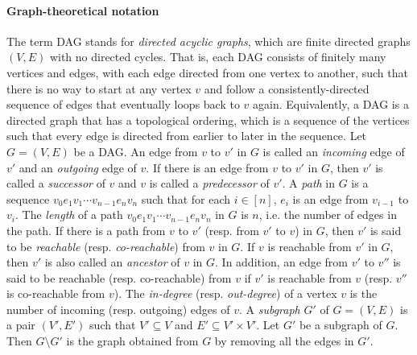 \paragraph{Graph-theoretical notation}
The term DAG stands for \emph{directed acyclic graphs}, which are finite directed graphs $(V, E)$ with no directed cycles. That is, each DAG consists of finitely many vertices and edges, with each edge directed from one vertex to another, such that there is no way to start at any vertex $\mathit{v}$ and follow a consistently-directed sequence of edges that eventually loops back to $\mathit{v}$ again. Equivalently, a DAG is a directed graph that has a topological ordering, which is a sequence of the vertices such that every edge is directed from earlier to later in the sequence. Let $G=(V,E)$ be a DAG. An edge from $\mathit{v}$ to $\mathit{v'}$ in $G$ is called an \emph{incoming} edge of $\mathit{v'}$ and an \emph{outgoing} edge of $\mathit{v}$. If there is an edge from $\mathit{v}$ to $\mathit{v'}$ in $G$, then $\mathit{v'}$ is called a \emph{successor} of $\mathit{v}$ and $\mathit{v}$ is called a \emph{predecessor} of $\mathit{v'}$. A \emph{path} in $G$ is a sequence $\mathit{v}_0 \mathit{e}_1 \mathit{v}_1 \cdots \mathit{v}_{n-1} \mathit{e}_n \mathit{v}_n$ such that for each $i \in [n]$, $e_i$ is an edge from $\mathit{v}_{i-1}$ to $\mathit{v}_i$. The \emph{length} of a path $\mathit{v}_0 e_1 \mathit{v}_1 \cdots \mathit{v}_{n-1} e_n \mathit{v}_n$ in $G$ is $n$, i.e. the number of edges in the path. If there is a path from $\mathit{v}$ to $\mathit{v'}$ (resp. from $\mathit{v'}$ to $\mathit{v}$) in $G$, then $\mathit{v'}$ is said to be \emph{reachable} (resp. \emph{co-reachable}) from $\mathit{v}$ in $G$. If $\mathit{v}$ is reachable from $\mathit{v'}$ in $G$, then $\mathit{v'}$ is also called an \emph{ancestor} of $\mathit{v}$ in $G$. In addition, an edge from $\mathit{v'}$ to $\mathit{v''}$ is said to be reachable (resp. co-reachable) from $\mathit{v}$ if $\mathit{v'}$ is reachable from $\mathit{v}$ (resp. $\mathit{v''}$ is co-reachable from $\mathit{v}$). The \emph{in-degree} (resp. \emph{out-degree}) of a vertex $\mathit{v}$ is the number of incoming (resp. outgoing) edges of $\mathit{v}$. 
A \emph{subgraph} $G'$ of $G=(V,E)$ is a pair $(V', E')$ such that $V' \subseteq V$ and $E' \subseteq V' \times V'$. Let $G'$ be a subgraph of $G$. Then $G \setminus G'$ is the graph obtained from $G$ by removing all the edges in $G'$. 


